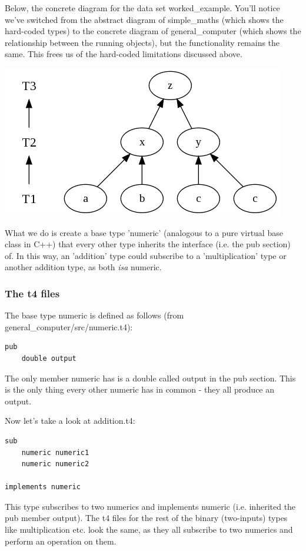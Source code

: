 \documentclass{report}
\begin{document}
Below, the concrete diagram for the data set worked_example. You'll notice we've switched from the abstract diagram of simple_maths (which shows the hard-coded types) to the concrete diagram of general_computer (which shows the relationship between the running objects), but the functionality remains the same. This frees us of the hard-coded limitations discussed above.

\includegraphics[scale=0.5]{generalcomputerworkedexample.png}

What we do is create a base type 'numeric' (analogous to a pure virtual base class in C++) that every other type inherits the interface (i.e. the pub section) of. In this way, an 'addition' type could subscribe to a 'multiplication' type or another addition type, as both \emph{isa} numeric.

\subsubsection{The t4 files}

The base type numeric is defined as follows (from general_computer/src/numeric.t4):

\begin{verbatim}
pub
    double output
\end{verbatim}

The only member numeric has is a double called output in the pub section. This is the only thing every other numeric has in common - they all produce an output.

Now let's take a look at addition.t4:

\begin{verbatim}
sub
    numeric numeric1
    numeric numeric2

implements numeric
\end{verbatim}

This type subscribes to two numerics and implements numeric (i.e. inherited the pub member output). The t4 files for the rest of the binary (two-inputs) types like multiplication etc. look the same, as they all subscribe to two numerics and perform an operation on them.
\end{document}
